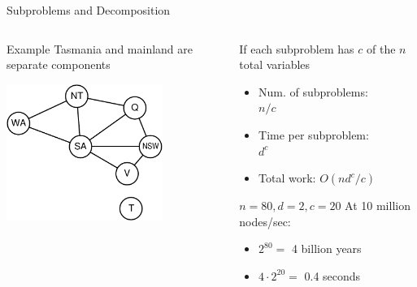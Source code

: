 \documentclass[14pt]{beamer}
\begin{document}
\begin{frame}{Subproblems and Decomposition}
	\begin{columns}
		\begin{column}{2in}
			\begin{block}{Example}
				Tasmania and mainland are separate components
			\end{block}
			\includegraphics[width=2in]{australia-csp.pdf}
		\end{column}
		\begin{column}{2in}
			\begin{block}{If each subproblem has $c$ of the $n$ total variables}
				\begin{itemize}
					\pause\item Num. of subproblems:\\
					\pause\hspace{2em}$n/c$
					\pause\item Time per subproblem:\\
					\pause\hspace{2em}$d^c$
					\pause\item Total work: \pause$O(nd^c/c)$
				\end{itemize}
			\end{block}
			\pause
			\begin{block}{$n=80, d=2, c=20$}
				At 10 million nodes/sec:
				\begin{itemize}
					\item $2^{80} =$ 4 billion years 
					\item $4 \cdot 2^{20} =$ 0.4 seconds
				\end{itemize}
			\end{block}
		\end{column}
	\end{columns}
\end{frame}
\end{document}

